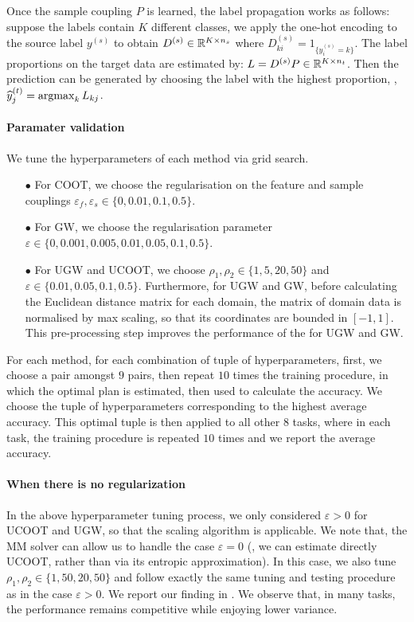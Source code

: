 Once the sample coupling $P$ is learned, the label propagation works as follows:
suppose the labels contain $K$ different classes,
we apply the one-hot encoding to the source label $y^{(s)}$ to obtain
$D^{(s)} \in \mathbb R^{K \times n_s}$ where $D^{(s)}_{ki} = 1_{\{y^{(s)}_i = k\}}$.
The label proportions on the target data are
estimated by: $L = D^{(s)} P \in \mathbb R^{K \times n_t}$. Then the prediction can be generated
by choosing the label with the highest proportion, \ie, $\widehat{y}^{(t)}_j = \operatorname*{argmax}_k L_{kj}$.

\paragraph{Paramater validation}

We tune the hyperparameters of each method via grid search.
\begin{itemize}
  \item[$\bullet$] For COOT, we choose the regularisation on the feature and sample couplings
  $\varepsilon_f, \varepsilon_s \in \{0, 0.01, 0.1, 0.5\}$.
  \item[$\bullet$] For GW, we choose the regularisation parameter
  $\varepsilon \in \{0, 0.001, 0.005, 0.01, 0.05, 0.1, 0.5\}$.
  \item[$\bullet$] For UGW and UCOOT, we choose $\rho_1, \rho_2 \in \{1, 5, 20, 50\}$ and
  $\varepsilon \in \{0.01, 0.05, 0.1, 0.5\}$.
  Furthermore, for UGW and GW, before calculating the Euclidean distance matrix for each domain,
  the matrix of domain data is normalised by max scaling, so that its coordinates are bounded in
  $[-1,1]$. This pre-processing step improves the performance of the for UGW and GW.
\end{itemize}
For each method, for each combination of tuple of hyperparameters, first, we choose a pair
amongst $9$ pairs, then repeat $10$ times the training procedure, in which the optimal plan
is estimated, then used to calculate the accuracy. We choose the tuple of hyperparameters
corresponding to the highest average accuracy. This optimal tuple is then applied to
all other $8$ tasks, where in each task, the training procedure is repeated $10$ times and
we report the average accuracy.

\paragraph{When there is no regularization} In the above hyperparameter tuning process,
we only considered $\varepsilon > 0$ for UCOOT and UGW, so that the scaling algorithm
\citep{Chizat18b} is applicable. We note that,
the MM solver can allow us to handle the case $\varepsilon = 0$
(\ie, we can estimate directly UCOOT, rather than via its entropic approximation).
In this case, we also tune $\rho_1, \rho_2 \in \{ 1, 50, 20, 50\}$ and
follow exactly the same tuning and testing procedure as in the case $\varepsilon > 0$.
We report our finding in . We observe that, in many tasks,
the performance remains competitive while enjoying lower variance.

